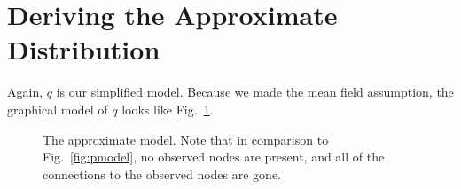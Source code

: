 \documentclass[12pt]{article}
\begin{document}
\section{Deriving the Approximate Distribution}

Again, $q$ is our simplified model.  Because we made the mean field assumption,
the graphical model of $q$ looks like Fig.~\ref{fig:qmodel}.

\begin{figure}[h]
    \centering
{}
    \caption{The approximate model.  Note that in comparison to
    Fig.~\ref{fig:pmodel}, no observed nodes are present, and all of the
    connections to the observed nodes are gone.}
    \label{fig:qmodel}
\end{figure}
\end{document}
